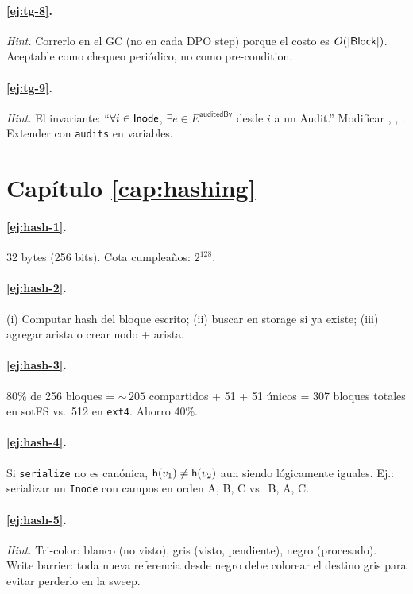 \paragraph{\ref{ej:tg-8}.} \emph{Hint.} Correrlo en el GC (no en cada
DPO step) porque el costo es $O(|\textsf{Block}|)$. Aceptable como chequeo
periódico, no como pre-condition.

\paragraph{\ref{ej:tg-9}.} \emph{Hint.} El invariante: ``$\forall i \in
\textsf{Inode}$, $\exists e \in E^{\textsf{auditedBy}}$ desde $i$ a un \textsf{Audit}.''
Modificar \opwrite, \opcreate, \oprename. Extender
 con \texttt{audits} en variables.

\section*{Capítulo \ref{cap:hashing}}

\paragraph{\ref{ej:hash-1}.} 32 bytes (256 bits). Cota cumpleaños:
$2^{128}$.

\paragraph{\ref{ej:hash-2}.} (i) Computar hash del bloque escrito; (ii)
buscar en storage si ya existe; (iii) agregar arista \epointsto{} o
crear nodo + arista.

\paragraph{\ref{ej:hash-3}.} 80\% de 256 bloques = ${\sim}\,205$
compartidos + 51 + 51 únicos = 307 bloques totales en sotFS vs.\ 512
en \texttt{ext4}. Ahorro 40\%.

\paragraph{\ref{ej:hash-4}.} Si \texttt{serialize} no es canónica,
$\mathsf{h}(v_1) \neq \mathsf{h}(v_2)$ aun siendo lógicamente iguales. Ej.:
serializar un \texttt{Inode} con campos en orden A, B, C vs.\ B, A, C.

\paragraph{\ref{ej:hash-5}.} \emph{Hint.} Tri-color: blanco (no
visto), gris (visto, pendiente), negro (procesado). Write barrier:
toda nueva referencia desde negro debe colorear el destino gris para
evitar perderlo en la sweep.

